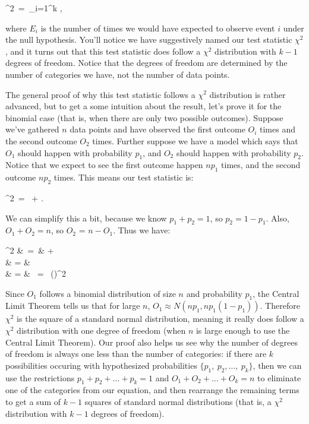 \bel

\chi^2\ =\ \sum_{i=1}^k ,

\eel

where $E_i$ is the number of times we would have expected to observe event $i$ under the null hypothesis.  You'll notice we have suggestively named our test statistic $\chi^2$, and it turns out that this test statistic does follow a $\chi^2$ distribution with $k-1$ degrees of freedom.  Notice that the degrees of freedom are determined by the number of categories we have, not the number of data points.



The general proof of why this test statistic follows a $\chi^2$ distribution is rather advanced, but to get a some intuition about the result, let's prove it for the binomial case (that is, when there are only two possible outcomes).  Suppose we've gathered $n$ data points and have observed the first outcome $O_i$ times and the second outcome $O_2$ times.  Further suppose we have a model which says that $O_1$ should happen with probability $p_1$, and $O_2$ should happen with probability $p_2$.  Notice that we expect to see the first outcome happen $np_1$ times, and the second outcome $np_2$ times.  This means our test statistic is:



\bel

\chi^2\ =\  + .

\eel

We can simplify this a bit, because we know $p_1 + p_2 = 1$, so $p_2 = 1 - p_1$.  Also, $O_1 + O_2 = n$, so $O_2$ = $n - O_1$.  Thus we have:



\bea

\chi^2 &\ =\ &  +  \nonumber\\  & = &  \nonumber\\ & = & \ = \ \left(\right)^2

\eea



Since $O_1$ follows a binomial distribution of size $n$ and probability $p_1$, the Central Limit Theorem tells us that for large $n$, $O_1 \approx N(np_1,np_1(1-p_1))$.  Therefore $\chi^2$ is the square of a standard normal distribution, meaning it really does follow a $\chi^2$ distribution with one degree of freedom (when $n$ is large enough to use the Central Limit Theorem).  Our proof also helps us see why the number of degrees of freedom is always one less than the number of categories: if there are $k$ possibilities occuring with hypothesized probabilities $\{p_1,\ p_2,...,\ p_k\}$, then we can use the restrictions $p_1 + p_2 + ... + p_k =1$ and $O_1 + O_2 + ... + O_k = n$ to eliminate one of the categories from our equation, and then rearrange the remaining terms to get a sum of $k-1$ squares of standard normal distributions (that is, a $\chi^2$ distribution with $k-1$ degrees of freedom).



